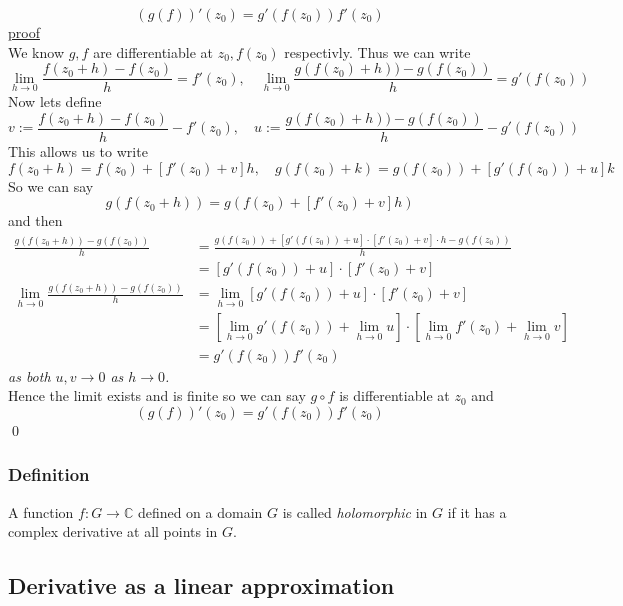 \documentclass[a4paper, 12pt, twoside]{article}
\begin{document}
\begin{itemize}
                    $$(g(f))'(z_{0})=g'(f(z_{0}))f'(z_{0}) $$
                    \underline{proof}\\
                    We know $g,f$ are differentiable at $z_{0}, f(z_{0})$ respectivly. Thus we can write
                    $$\lim_{h\to0}\frac{f(z_{0}+h)-f(z_{0})}{h}=f'(z_{0}),\quad \lim_{h\to0}\frac{g(f(z_{0})+h))-g(f(z_{0}))}{h} =g'(f(z_{0}))$$
                    Now lets define
                    $$v:= \frac{f(z_{0}+h)-f(z_{0})}{h}-f'(z_{0}), \quad
                    u:=\frac{g(f(z_{0})+h))-g(f(z_{0}))}{h} -g'(f(z_{0}))$$
                    This allows us to write
                    $$f(z_{0}+h)=f(z_{0})+[f'(z_{0})+v]h,\quad g(f(z_{0})+k)=g(f(z_{0}))+[g'(f(z_{0}))+u]k $$
                    So we can say
                    $$g(f(z_{0}+h))= g(f(z_{0})+[f'(z_{0})+v]h)$$
                    and then
                    \begin{align*}
                        \frac{g(f(z_{0}+h))-g(f(z_{0}))}{h} &= \frac{g(f(z_{0}))+[g'(f(z_{0}))+u]\cdot[f'(z_{0})+v]\cdot h- g(f(z_{0}))}{h}\\
                        &=[g'(f(z_{0}))+u]\cdot[f'(z_{0})+v]\\
                        \lim_{h\to0}\frac{g(f(z_{0}+h))-g(f(z_{0}))}{h} &=
                        \lim_{h\to0}[g'(f(z_{0}))+u]\cdot[f'(z_{0})+v]\\
                        &=[\lim_{h\to0}g'(f(z_{0}))+\lim_{h\to0}u]\cdot[\lim_{h\to0}f'(z_{0})+\lim_{h\to0}v]\\
                        &=g'(f(z_{0}))f'(z_{0})
                    \end{align*}
                    \textit{as both $u,v\to 0 $ as $h\to 0$.}\\
                    Hence the limit exists and is finite so we can say $g\circ f$ is differentiable at $z_{0}$ and
                    $$(g(f))'(z_{0})=g'(f(z_{0}))f'(z_{0}) $$\qed

                \end{itemize}
                \subsubsection{Definition}
                    A function $f:G \to  \mathbb{C}$ defined on a domain $G$ is called \emph{holomorphic} in $G$ if it has a complex derivative at all points in $G$.
            \newpage
            \subsection{Derivative as a linear approximation}
\end{document}
